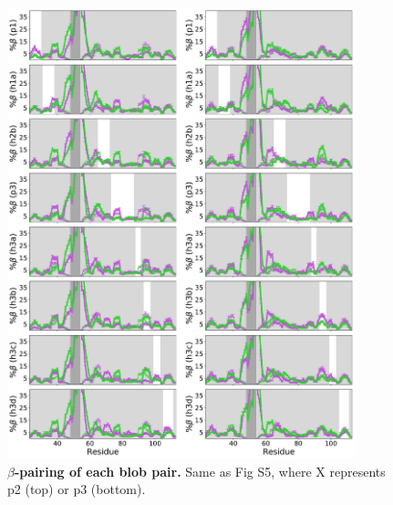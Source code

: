 \documentclass[10pt,letterpaper]{article}
\begin{document}
\begin{figure}[!ht]
\includegraphics[scale=0.5,width=0.9\textwidth,trim={0 0cm 0 0cm},clip]{./figures/S10.pdf}
\caption{{\bf $\beta$-pairing of each blob pair.} Same as Fig S5, where X represents p2 (top) or p3 (bottom).} 
\label{S10} 
\end{figure}
\end{document}
